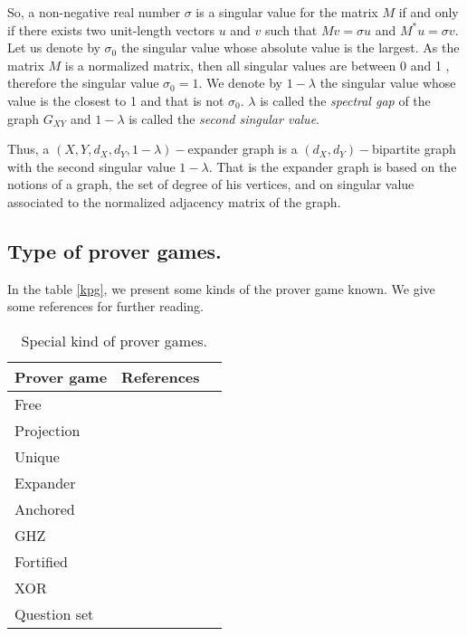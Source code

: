 So, a non-negative real number $\sigma$ is a singular value for the matrix $M$ if and only if there exists two unit-length vectors $u$ and $v$ such that $Mv=\sigma u$ and $M^*u=\sigma v.$ Let us denote by $\sigma_0$ the singular value whose absolute value is the largest.  As the matrix $M$ is a normalized matrix, then all singular values are between 0 and 1 , therefore the singular value $\sigma_0=1.$ We denote by $1-\lambda$ the singular value whose value is the closest to 1 and that is not $\sigma_0$. $\lambda$ is called the \textit{spectral gap} of the graph $G_{XY}$ and $1-\lambda$ is called the \textit{second singular value}.

Thus, a $(X,Y,d_X,d_Y,1-\lambda)-$expander graph is a $(d_X,d_Y)-$bipartite graph with the second singular value $1-\lambda.$ That is the expander graph is based on the notions of a graph, the set of  degree of his vertices, and  on  singular value  associated to the normalized adjacency matrix  of the graph.

\subsection{Type of prover games.}

In the table \eqref{kpg}, we present some kinds of the prover game known. We give some references for further reading.

\begin{table}[h]
\begin{center}
\begin{tabular}{lll}
\hline 
\textbf{Prover game} &  \textbf{References} \\ 
\hline 
Free & \cite{verbitsky1996towards} \\ Projection & \cite{rao2011parallel} \\ Unique &\cite{tamaki2015parallel}  \\ Expander & \cite{dinur2016multiplayer} \\ Anchored & \cite{bavarian2015anchoring} \\ GHZ & \cite{dinur2016multiplayer} \\ Fortified & \cite{moshkovitz2014parallel} \\ XOR & \cite{cleve2007perfect} \\ Question set & \cite{hkazla2016forbidden}\\
\hline 
\end{tabular} 
\end{center}
\caption{Special kind of prover games.} \label{kpg}
\end{table}




